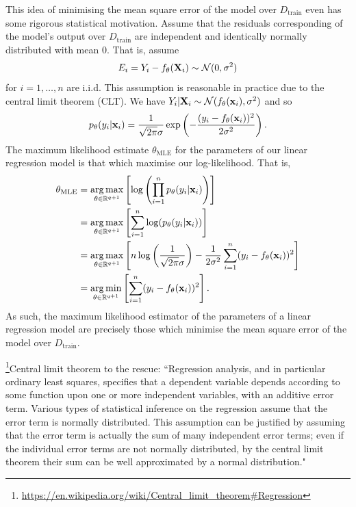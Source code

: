 \documentclass[11pt]{article}
\begin{document}
This idea of minimising the mean square error of the model over $D_{\text{train}}$ even has some rigorous statistical motivation. Assume that the residuals corresponding of the model's output over $D_{\text{train}}$ are independent and identically normally distributed with mean 0. That is, assume
$$
E_i
=
Y_i-f_{\theta}(\mathbf{X}_i)\sim\mathcal{N}(0, \sigma^2)
$$
for $i=1,\dots,n$ are i.i.d. This assumption is reasonable in practice due to the central limit theorem (CLT). We have $Y_i|\mathbf{X}_i\sim\mathcal{N}(f_{\theta}(\mathbf{x}_i), \sigma^2)$ and so
$$
p_{\theta}(y_i|\mathbf{x}_i)=\frac{1}{\sqrt{2\pi}\sigma}\exp\left(-\frac{(y_i-f_{\theta}(\mathbf{x}_i))^2}{2\sigma^2}\right).
$$
The maximum likelihood estimate $\theta_{\text{MLE}}$ for the parameters of our linear regression model is that which maximise our log-likelihood. That is,
\begin{align*}
    \theta_{\text{MLE}}
    &=
    \operatorname*{arg\,max}_{\theta\in\mathbb{R}^{q+1}}\left[\log\left(\prod_{i=1}^n p_{\theta}(y_i|\mathbf{x}_i)\right)\right]\\
    &=
    \operatorname*{arg\,max}_{\theta\in\mathbb{R}^{q+1}}\left[\sum_{i=1}^n\log(p_{\theta}(y_i|\mathbf{x}_i))\right]\\
    &=
    \operatorname*{arg\,max}_{\theta\in\mathbb{R}^{q+1}}\left[n\log\left(\frac{1}{\sqrt{2\pi}\sigma}\right)-\frac{1}{2\sigma^2}\sum_{i=1}^n(y_i-f_{\theta}(\mathbf{x}_i))^2\right]\\
    &=
    \operatorname*{arg\,min}_{\theta\in\mathbb{R}^{q+1}}\left[\sum_{i=1}^n(y_i-f_{\theta}(\mathbf{x}_i))^2\right].
\end{align*}
As such, the maximum likelihood estimator of the parameters of a linear regression model are precisely those which minimise the mean square error of the model over $D_{\text{train}}$.

\begin{tcolorbox}[title={\centering\textbf{Are residuals really normally distributed?}}, colback=myLightBlue, colbacktitle=myDarkBlue, colframe=myDarkBlue, coltitle=white]
    \footnote{\url{https://en.wikipedia.org/wiki/Central\_limit\_theorem\#Regression}}Central limit theorem to the rescue: ``Regression analysis, and in particular ordinary least squares, specifies that a dependent variable depends according to some function upon one or more independent variables, with an additive error term. Various types of statistical inference on the regression assume that the error term is normally distributed. This assumption can be justified by assuming that the error term is actually the sum of many independent error terms; even if the individual error terms are not normally distributed, by the central limit theorem their sum can be well approximated by a normal distribution."
\end{tcolorbox}
\end{document}
